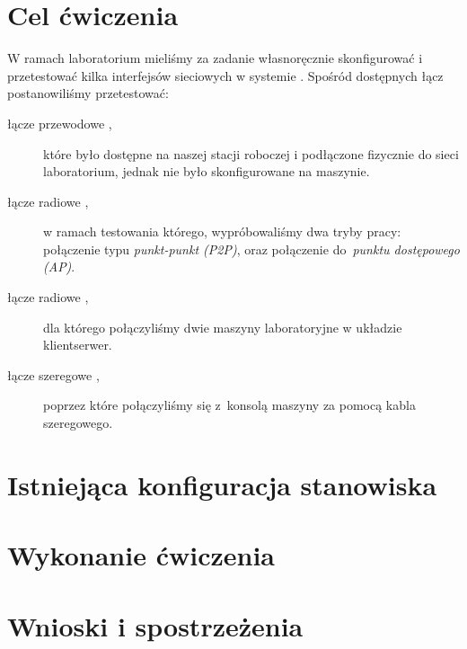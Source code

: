 \documentclass[a4paper,11pt,notitlepage]{article}
\begin{document}

\maketitle
\tableofcontents


\section{Cel ćwiczenia}

W ramach laboratorium mieliśmy za zadanie własnoręcznie skonfigurować i
przetestować kilka interfejsów sieciowych w systemie \bsd. Spośród dostępnych
łącz postanowiliśmy przetestować:

\begin{description}
    \item[łącze przewodowe \eth\textnormal{,}] które było dostępne na naszej
    stacji roboczej i podłączone fizycznie do sieci laboratorium, jednak nie
    było skonfigurowane na maszynie.
    \item[łącze radiowe \wifi\textnormal{,}] w ramach testowania którego,
    wypróbowaliśmy dwa tryby pracy: połączenie typu \emph{punkt-punkt (P2P)},
    oraz połączenie do~\emph{punktu dostępowego (AP)}.
    \item[łącze radiowe \bt\textnormal{,}] dla którego połączyliśmy dwie
    maszyny laboratoryjne w układzie klient\dywiz serwer.
    \item[łącze szeregowe \uart\textnormal{,}] poprzez które połączyliśmy się
    z~konsolą maszyny \zielone{} za pomocą kabla szeregowego.
\end{description}


\section{Istniejąca konfiguracja stanowiska}


\section{Wykonanie ćwiczenia}



\section{Wnioski i spostrzeżenia}
\end{document}
